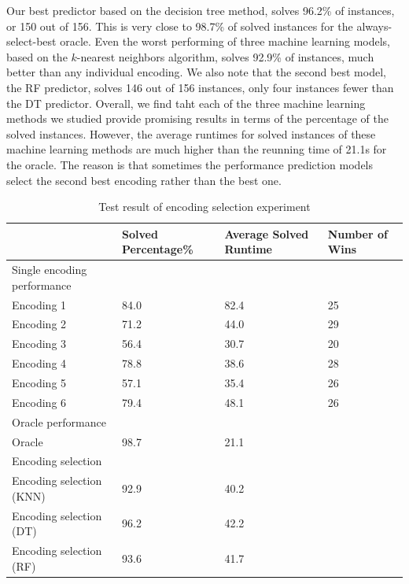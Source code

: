 \documentclass{new_tlp}
\begin{document}
Our best predictor based on the decision tree method, solves 96.2\% of 
instances, or 150 out of 156. This is very close to 98.7\% of solved
instances for the always-select-best oracle. Even the worst performing of 
three machine learning models, based on the $k$-nearest neighbors algorithm,
solves 92.9\% of instances, much better than any individual encoding. We 
also note that the second best model, the RF predictor, solves 146 out of 
156 instances, only four instances fewer than the DT predictor. Overall, we 
find taht each of the three machine learning methods we studied provide 
promising results in terms of the percentage of the solved instances. However, 
the average runtimes for solved instances of these machine learning methods 
are much higher than the reunning time of 21.1s for the oracle. The reason 
is that sometimes the performance prediction models select the second best
encoding rather than the best one.

\begin{table}
\caption{Test result of encoding selection experiment } \label{ecresult1}
\programmath
\begin{tabular}{llll}
\hline\hline
%
                  & Solved Percentage\% & Average Solved Runtime & Number of Wins \\ \hline%
Single encoding performance & & &                                     \\ %
Encoding 1        & 84.0           & 82.4                      & 25            \\ %
Encoding 2        & 71.2           & 44.0                      & 29            \\ %
Encoding 3        & 56.4           & 30.7                       & 20            \\ %
Encoding 4        & 78.8           & 38.6                      & 28            \\ %
Encoding 5        & 57.1           & 35.4                      & 26            \\ %
Encoding 6        & 79.4           & 48.1                      & 26            \\\hline %
Oracle performance  & & &                                               \\ %
Oracle            & 98.7           & 21.1                      &               \\ \hline
Encoding selection & & &                                                \\ %
Encoding selection (KNN) & 92.9          & 40.2                    &               \\ %
Encoding selection (DT) & 96.2&42.2       &               \\ %
Encoding selection (RF) & 93.6&41.7	      &               \\ %
\hline\hline
\end{tabular}
\programmath
\end{table}
\end{document}
